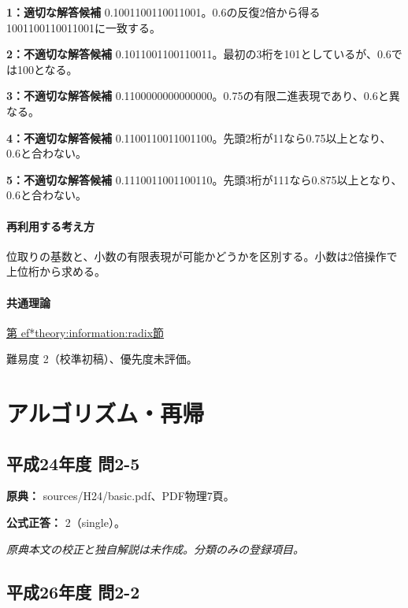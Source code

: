 \noindent\textbf{1：適切な解答候補} 0.1001100110011001。0.6の反復2倍から得る1001100110011001に一致する。\par

\noindent\textbf{2：不適切な解答候補} 0.1011001100110011。最初の3桁を101としているが、0.6では100となる。\par

\noindent\textbf{3：不適切な解答候補} 0.1100000000000000。0.75の有限二進表現であり、0.6と異なる。\par

\noindent\textbf{4：不適切な解答候補} 0.1100110011001100。先頭2桁が11なら0.75以上となり、0.6と合わない。\par

\noindent\textbf{5：不適切な解答候補} 0.1110011001100110。先頭3桁が111なら0.875以上となり、0.6と合わない。\par

\paragraph{再利用する考え方} 位取りの基数と、小数の有限表現が可能かどうかを区別する。小数は2倍操作で上位桁から求める。

\paragraph{共通理論} \hyperref[theory:information:radix]{第
ef*{theory:information:radix}節}

\par 難易度 2（校準初稿）、優先度未評価。

\section{アルゴリズム・再帰}

\subsection{平成24年度 問2-5}
\label{q:h24-reg-basic-2-5}

\noindent\textbf{原典：} sources/H24/basic.pdf、PDF物理7頁。

\textbf{公式正答：} 2（single）。

\par\textit{原典本文の校正と独自解説は未作成。分類のみの登録項目。}

\subsection{平成26年度 問2-2}
\label{q:h26-reg-basic-2-2}

